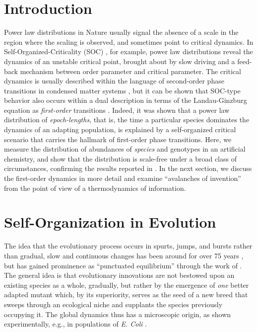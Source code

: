 \documentclass[letterpaper]{article}
\begin{document}
\section{Introduction}
Power law distributions in Nature usually signal the absence of a
scale in the region where the scaling is observed, and sometimes point
to critical dynamics. In Self-Organized-Criticality (SOC)
\citep{BTW87,BTW88}, for example, power law distributions reveal the
dynamics of an unstable critical point, brought about by slow driving
and a feed-back mechanism between order parameter and critical
parameter.  The critical dynamics is usually described within the
language of second-order phase transitions in condensed matter systems
\citep{SJD}, but it can be shown that SOC-type behavior also occurs
within a dual description in terms of the Landau-Ginzburg equation as
{\em first-order} transitions \citep{GS}.  Indeed, it was shown that a
power law distribution of {\em epoch-lengths}, that is, the time a
particular species dominates the dynamics of an adapting population,
is explained by a self-organized critical scenario \citep{CA2} that
carries the hallmark of first-order phase transitions. Here, we
measure the distribution of abundances of {\em species} and genotypes
in an artificial chemistry, \citep[the Avida Artificial Life
system][]{AB1,OBA} and show that the distribution is scale-free under
a broad class of circumstances, confirming the results reported in
\citep{CA2}.  In the next section, we discuss the first-order dynamics
in more detail and examine ``avalanches of invention'' from the point
of view of a thermodynamics of information.



\section{Self-Organization in Evolution}
The idea that the evolutionary process occurs in spurts, jumps, and
bursts rather than gradual, slow and continuous changes has been
around for over 75 years \citep{WIL}, but has gained prominence as
``punctuated equilibrium'' through the work of \citet{GE77,GE93}. The
general idea is that evolutionary innovations are not bestowed upon an
existing species as a whole, gradually, but rather by the emergence of
{\em one} better adapted mutant which, by its superiority, serves as
the seed of a new breed that sweeps through an ecological niche and
supplants the species previously occupying it. The global dynamics
thus has a microscopic origin, as shown experimentally, e.g., in
populations of {\it E. Coli} \citep{ECL96}.
\end{document}
